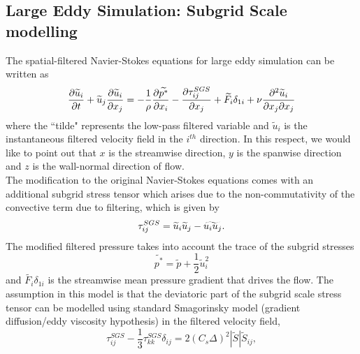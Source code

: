 \documentclass[times]{fldauth}
\begin{document}
\subsection{Large Eddy Simulation: Subgrid Scale modelling }
\label{LES}
The spatial-filtered Navier-Stokes equations for large eddy simulation can be written as
\begin{equation}
\frac{\partial \widetilde{u}_i}{\partial t} + \widetilde{u}_j\frac{\partial \widetilde{u}_i}{\partial x_j} = -\frac{1}{\rho}\frac{\partial \widetilde{p^{*}}}{\partial x_i} - \frac{\partial \tau^{\small SGS}_{ij}}{\partial x_j} + \widetilde{F_{i}}\delta_{1i} + \nu\frac{\partial^2\widetilde{u}_i}{\partial x_j \partial x_j} \label{leseq}
\end{equation}
where the ``tilde" represents the low-pass filtered variable and $\widetilde{u}_i$ is the instantaneous filtered velocity field in the $i^{th}$ direction. In this respect, we would like to point out that $x$ is the streamwise direction, $y$ is the spanwise direction and $z$ is the wall-normal direction of flow.\\
The modification to the original Navier-Stokes equations comes with an additional subgrid stress tensor which arises due to the non-commutativity of the convective term due to filtering, which is given by
\begin{equation}
\tau^{\tiny SGS}_{ij} = \widetilde{u}_i\widetilde{u}_j - \widetilde{{u}_i{u}_j}.
\end{equation}
The modified filtered pressure takes into account the trace of the subgrid stresses
\begin{equation}
\widetilde{p^{*}} = \widetilde{p} + \frac{1}{2}\widetilde{u}_{i}^2
\end{equation}
and $\widetilde{F_{i}}\delta_{1i}$ is the streamwise mean pressure gradient that drives the flow.
The assumption in this model is that the deviatoric part of the subgrid scale stress tensor can be modelled using standard Smagorinsky model (gradient diffusion/eddy viscosity hypothesis) in the filtered velocity field,
\begin{equation}
\tau^{SGS}_{ij} - \frac{1}{3}\tau^{SGS}_{kk}\delta_{ij} = 2(C_s\Delta)^2|\widetilde{S}|\widetilde{S}_{ij}, \label{sgs}
\end{equation}
\end{document}
